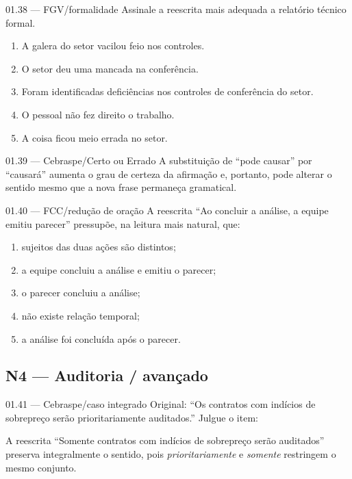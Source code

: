 \begin{questao}{ 01.38 — FGV/formalidade}
Assinale a reescrita mais adequada a relatório técnico formal.
\begin{enumerate}[label=\Alph*)]
\item A galera do setor vacilou feio nos controles.
\item O setor deu uma mancada na conferência.
\item Foram identificadas deficiências nos controles de conferência do setor.
\item O pessoal não fez direito o trabalho.
\item A coisa ficou meio errada no setor.
\end{enumerate}
\end{questao}

\begin{questao}{ 01.39 — Cebraspe/Certo ou Errado}
A substituição de ``pode causar'' por ``causará'' aumenta o grau de certeza da afirmação e, portanto, pode alterar o sentido mesmo que a nova frase permaneça gramatical.
\end{questao}

\begin{questao}{ 01.40 — FCC/redução de oração}
A reescrita ``Ao concluir a análise, a equipe emitiu parecer'' pressupõe, na leitura mais natural, que:
\begin{enumerate}[label=\Alph*)]
\item sujeitos das duas ações são distintos;
\item a equipe concluiu a análise e emitiu o parecer;
\item o parecer concluiu a análise;
\item não existe relação temporal;
\item a análise foi concluída após o parecer.
\end{enumerate}
\end{questao}

\subsection*{N4 — Auditoria / avançado}

\begin{questao}{ 01.41 — Cebraspe/caso integrado}
Original: ``Os contratos com indícios de sobrepreço serão prioritariamente auditados.'' Julgue o item:

A reescrita ``Somente contratos com indícios de sobrepreço serão auditados'' preserva integralmente o sentido, pois \emph{prioritariamente} e \emph{somente} restringem o mesmo conjunto.
\end{questao}

